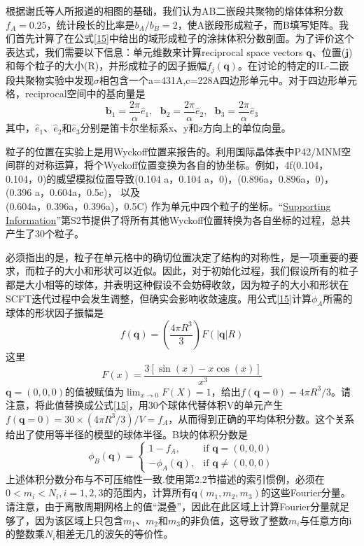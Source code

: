 \documentclass[12pt,a4paper]{article}
\begin{document}
根据谢氏等人所报道的相图的基础，我们认为AB二嵌段共聚物的熔体体积分数$f_A=0.25$，统计段长的比率是$b_A/b_B=2$，使A嵌段形成粒子，而B填写矩阵。我们首先计算了在公式\ref{15}中给出的域形成粒子的涂抹体积分数剖面。为了评价这个表达式，我们需要以下信息：单元维数来计算reciprocal space vectors $\mathbf{q}$、位置($\mathbf{j}$)和每个粒子的大小(R)，并形成粒子的因子振幅$f_j(\mathbf{q})$。在讨论的特定的IL-二嵌段共聚物实验中发现$\sigma$相包含一个a=431A,c=228A四边形单元中。对于四边形单元格，reciprocal空间中的基向量是
\begin{equation}\label{17}
\mathbf{b}_1=\frac{2\pi}{\alpha}\hat{e}_1,~~~\mathbf{b}_2=\frac{2\pi}{\alpha}\hat{e}_2,~~~\mathbf{b}_3=\frac{2\pi}{\alpha}\hat{e}_3
\end{equation}
其中，$\hat{e}_1$、$\hat{e}_2$和$\hat{e}_3$分别是笛卡尔坐标系x、y和z方向上的单位向量。

粒子的位置在实验上是用Wyckoff位置来报告的。利用国际晶体表中P42/MNM空间群的对称运算，将个Wyckoff位置变换为各自的协坐标。例如，4f(0.104，0.104，0)的威望模拟位置导致(0.104 a，0.104 a，0)，(0.896a，0.896a，0)，(0.396 a，0.604a，0.5c)，
以及\\
(0.604a，0.396a，0.396a)，0.5C)
作为单元中四个粒子的坐标。“\href{http://pubs.acs.org/doi/suppl/10.1021/acs.macromol.6b00107/suppl_file/ma6b00107_si_001.pdf}{Supporting Information}”第S2节提供了将所有其他Wyckoff位置转换为各自坐标的过程，总共产生了30个粒子。

必须指出的是，粒子在单元格中的确切位置决定了结构的对称性，是一项重要的要求，而粒子的大小和形状可以近似。因此，对于初始化过程，我们假设所有的粒子都是大小相等的球体，并表明这种假设不会妨碍收敛，因为粒子的大小和形状在SCFT迭代过程中会发生调整，但确实会影响收敛速度。用公式\ref{15}计算$\phi _A$所需的球体的形状因子振幅是
\begin{equation}\label{18}
f(\mathbf{q})=\left( \frac{4\pi R^3}{3} \right)F(|\mathbf{q}|R)
\end{equation}
这里
\begin{equation}\label{19}
F(x)=\frac{3\left[ \sin(x) -x\cos(x) \right]}{x^3}
\end{equation}
$\mathbf{q}=(0,0,0)$的值被赋值为$\lim _{x\rightarrow 0} F(X)=1$，给出$f(\mathbf{q}=0)=4\pi R^3/3$。请注意，将此值替换成公式\ref{15}，用30个球体代替体积V的单元产生$f(\mathbf{q}=0)=30×(4\pi R^3/3)/V=f_A$，从而得到正确的平均体积分数。这个关系给出了使用等半径的模型的球体半径。B块的体积分数是
\begin{equation}\label{20}
\phi _B(\mathbf{q}) =
\begin{cases}
1-f_A, & \mbox{if }\mathbf{q}=(0,0,0)\\
-\phi _A(\mathbf{q}), & \mbox{if }\mathbf{q}\neq (0,0,0)
\end{cases}
\end{equation}
上述体积分数分布与不可压缩性一致.使用第2.2节描述的索引惯例，必须在$0<m_i<N_i,i=1,2,3$的范围内，计算所有$\mathbf{q}(m_1,m_2,m_3)$的这些Fourier分量。请注意，由于离散周期网格上的值“混叠”，因此在此区域上计算Fourier分量就足够了，因为该区域上只包含$m_1$、$m_2$和$m_3$的非负值，这导致了整数$m_i$与任意方向i的整数乘$N_i$相差无几的波矢的等价性。
\end{document}

